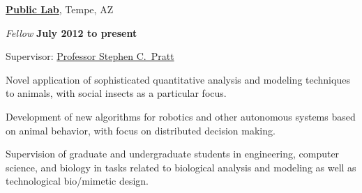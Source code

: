 \documentclass[10pt]{article}
\newcommand{\halfblankline}{\quad\vspace{-0.5\baselineskip}\pagebreak[3]}
\begin{document}
\href{http://www.asu.edu/}{\textbf{Public Lab}},
Tempe, AZ
\begin{outerlist}

    \item[] \textit{Fellow}%
            \hfill \textbf{July 2012 to present}
            \begin{innerlist}
                \item Supervisor:
                        \href{http://www.public.asu.edu/~spratt1/}%
                             {Professor Stephen C.~Pratt}

                \item Novel application of sophisticated quantitative
                    analysis and modeling techniques to animals, with
                    social insects as a particular focus.

                \item Development of new algorithms for robotics and
                    other autonomous systems based on animal behavior,
                    with focus on distributed decision making.

                \item Supervision of graduate and undergraduate students
                    in engineering, computer science, and biology in
                    tasks related to biological analysis and modeling as
                    well as technological bio\-/mimetic design.
            \end{innerlist}

\end{outerlist}

\halfblankline
\end{document}
